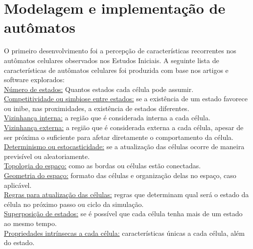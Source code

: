 \documentclass[
	12pt,				%
	openright,			%
	twoside,			%
	a4paper,			%
	english,			%
	french,				%
	spanish,			%
	brazil				%
	]{abntex2}
\begin{document}
\section{Modelagem e implementação de autômatos}

O primeiro desenvolvimento foi a percepção de características recorrentes nos autômatos celulares observados nos Estudos Iniciais.
A seguinte lista de características de autômatos celulares foi produzida com base nos artigos e software explorados:\\
\underline{Número de estados:} Quantos estados cada célula pode assumir.\\
\underline{Competitividade ou simbiose entre estados:} se a existência de um estado favorece ou inibe, nas proximidades, a existência de estados diferentes.\\
\underline{Vizinhança interna:} a região que é considerada interna a cada célula.\\
\underline{Vizinhança externa:} a região que é considerada externa a cada célula, apesar de ser próxima o suficiente para afetar diretamente o comportamento da célula.\\
\underline{Determinismo ou estocasticidade:} se a atualização das células ocorre de maneira previsível ou aleatoriamente.\\
\underline{Topologia do espaço:} como as bordas ou células estão conectadas.\\
\underline{Geometria do espaço:} formato das células e organização delas no espaço, caso aplicável.\\
\underline{Regras para atualização das células:} regras que determinam qual será o estado da célula no próximo passo ou ciclo da simulação.\\
\underline{Superposição de estados:} se é possível que cada célula tenha mais de um estado ao mesmo tempo.\\
\underline{Propriedades intrínsecas a cada célula:} características únicas a cada célula, além do estado.
\end{document}
